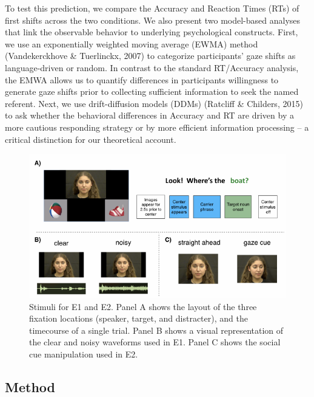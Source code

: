 \documentclass[10pt, letterpaper]{article}
\newenvironment{CodeChunk}{}{}
\begin{document}
To test this prediction, we compare the Accuracy and Reaction Times
(RTs) of first shifts across the two conditions. We also present two
model-based analyses that link the observable behavior to underlying
psychological constructs. First, we use an exponentially weighted moving
average (EWMA) method (Vandekerckhove \& Tuerlinckx, 2007) to categorize
participants' gaze shifts as language-driven or random. In contrast to
the standard RT/Accuracy analysis, the EMWA allows us to quantify
differences in participants willingness to generate gaze shifts prior to
collecting sufficient information to seek the named referent. Next, we
use drift-diffusion models (DDMs) (Ratcliff \& Childers, 2015) to ask
whether the behavioral differences in Accuracy and RT are driven by a
more cautious responding strategy or by more efficient information
processing -- a critical distinction for our theoretical account.

\begin{CodeChunk}
\begin{figure}[tb]

{\centering \includegraphics[width=0.9\linewidth]{figs/stimuli_plot-1} 

}

\caption[Stimuli for E1 and E2]{Stimuli for E1 and E2. Panel A shows the layout of the three fixation locations (speaker, target, and distracter), and the timecourse of a single trial. Panel B shows a visual representation of the clear and noisy waveforms used in E1. Panel C shows the social cue manipulation used in E2.}\label{fig:stimuli_plot}
\end{figure}
\end{CodeChunk}

\subsection{Method}\label{method}
\end{document}
